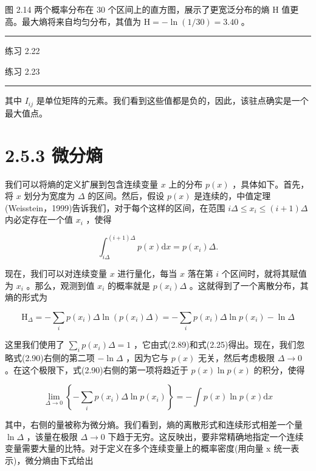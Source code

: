 \documentclass[10pt]{report}
\newcommand{\HRule}{\begin{center}\rule{0.9\linewidth}{0.2mm}\end{center}}
\begin{document}
图 2.14 两个概率分布在 30 个区间上的直方图，展示了更宽泛分布的熵 \(\mathrm{H}\) 值更高。最大熵将来自均匀分布，其值为 \(\mathrm{H} =  - \ln \left( {1/{30}}\right)  = {3.40}\) 。

\HRule

练习 2.22

练习 2.23

\HRule

其中 \({I}_{ij}\) 是单位矩阵的元素。我们看到这些值都是负的，因此，该驻点确实是一个最大值点。

\section*{2.5.3 微分熵}

我们可以将熵的定义扩展到包含连续变量 \(x\) 上的分布 \(p\left( x\right)\) ，具体如下。首先，将 \(x\) 划分为宽度为 \(\Delta\) 的区间。然后，假设 \(p\left( x\right)\) 是连续的，中值定理(Weisstein，1999)告诉我们，对于每个这样的区间，在范围 \({i\Delta } \leq  {x}_{i} \leq  \left( {i + 1}\right) \Delta\) 内必定存在一个值 \({x}_{i}\) ，使得

\[
{\int }_{i\Delta }^{\left( {i + 1}\right) \Delta }p\left( x\right) \mathrm{d}x = p\left( {x}_{i}\right) \Delta . \tag{2.89}
\]

现在，我们可以对连续变量 \(x\) 进行量化，每当 \(x\) 落在第 \(i\) 个区间时，就将其赋值为 \({x}_{i}\) 。那么，观测到值 \({x}_{i}\) 的概率就是 \(p\left( {x}_{i}\right) \Delta\) 。这就得到了一个离散分布，其熵的形式为

\[
{\mathrm{H}}_{\Delta } =  - \mathop{\sum }\limits_{i}p\left( {x}_{i}\right) \Delta \ln \left( {p\left( {x}_{i}\right) \Delta }\right)  =  - \mathop{\sum }\limits_{i}p\left( {x}_{i}\right) \Delta \ln p\left( {x}_{i}\right)  - \ln \Delta  \tag{2.90}
\]

这里我们使用了 \(\mathop{\sum }\limits_{i}p\left( {x}_{i}\right) \Delta  = 1\) ，它由式(2.89)和式(2.25)得出。现在，我们忽略式(2.90)右侧的第二项 \(- \ln \Delta\) ，因为它与 \(p\left( x\right)\) 无关，然后考虑极限 \(\Delta  \rightarrow  0\) 。在这个极限下，式(2.90)右侧的第一项将趋近于 \(p\left( x\right) \ln p\left( x\right)\) 的积分，使得

\[
\mathop{\lim }\limits_{{\Delta  \rightarrow  0}}\left\{  {-\mathop{\sum }\limits_{i}p\left( {x}_{i}\right) \Delta \ln p\left( {x}_{i}\right) }\right\}   =  - \int p\left( x\right) \ln p\left( x\right) \mathrm{d}x \tag{2.91}
\]

其中，右侧的量被称为微分熵。我们看到，熵的离散形式和连续形式相差一个量 \(\ln \Delta\) ，该量在极限 \(\Delta  \rightarrow  0\) 下趋于无穷。这反映出，要非常精确地指定一个连续变量需要大量的比特。对于定义在多个连续变量上的概率密度(用向量 \(\mathrm{x}\) 统一表示)，微分熵由下式给出
\end{document}
